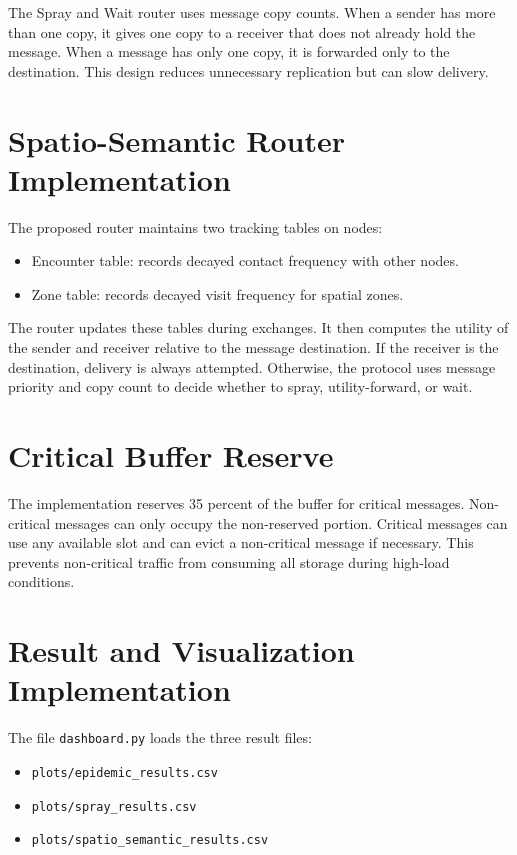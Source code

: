 The Spray and Wait router uses message copy counts. When a sender has more than one copy, it gives one copy to a receiver that does not already hold the message. When a message has only one copy, it is forwarded only to the destination. This design reduces unnecessary replication but can slow delivery.

\section{Spatio-Semantic Router Implementation}
The proposed router maintains two tracking tables on nodes:

\begin{itemize}
	\item Encounter table: records decayed contact frequency with other nodes.
	\item Zone table: records decayed visit frequency for spatial zones.
\end{itemize}

The router updates these tables during exchanges. It then computes the utility of the sender and receiver relative to the message destination. If the receiver is the destination, delivery is always attempted. Otherwise, the protocol uses message priority and copy count to decide whether to spray, utility-forward, or wait.

\section{Critical Buffer Reserve}
The implementation reserves 35 percent of the buffer for critical messages. Non-critical messages can only occupy the non-reserved portion. Critical messages can use any available slot and can evict a non-critical message if necessary. This prevents non-critical traffic from consuming all storage during high-load conditions.

\section{Result and Visualization Implementation}
The file \verb|dashboard.py| loads the three result files:

\begin{itemize}
	\item \verb|plots/epidemic_results.csv|
	\item \verb|plots/spray_results.csv|
	\item \verb|plots/spatio_semantic_results.csv|
\end{itemize}

